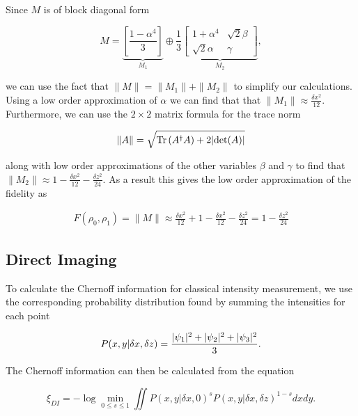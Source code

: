 \documentclass{article}
\DeclarePairedDelimiter\abs{\lvert}{\rvert}%
\begin{document}
Since $M$ is of block diagonal form

\begin{equation}
M = \underbrace{\left[ \frac{1-\alpha^4}{3} \right]}_{M_1} \oplus \frac{1}{3} \underbrace{\begin{bmatrix} 1+\alpha^4 & \sqrt{2}\beta \\ \sqrt{2}\alpha & \gamma \end{bmatrix}}_{M_2},
\end{equation}

we can use the fact that $\|M\| = \|M_1\| + \|M_2\|$ to simplify our calculations.
Using a low order approximation of $\alpha$ we can find that that  $\|M_1\| \approx \frac{\delta x^2}{12}$.
Furthermore, we can use the $2 \times 2$ matrix formula for the trace norm

\begin{equation}
\|A\| = \sqrt{\mathrm{Tr}\left(A^\dagger A \right) + 2 \abs{\mathrm{det}(A)}}
\end{equation}

along with low order approximations of the other variables $\beta$ and $\gamma$ to find that $\|M_2\| \approx 1 - \frac{\delta x^2}{12} - \frac{\delta z^2}{24}$.
As a result this gives the low order approximation of the fidelity as

\begin{equation}
\begin{aligned}
F(\rho_0,\rho_1) = \|M\| \approx \frac{\delta x^2}{12} + 1 - \frac{\delta x^2}{12} - \frac{\delta z^2}{24} = 1 - \frac{\delta z^2}{24}
\end{aligned}
\end{equation}

\subsection*{Direct Imaging}

To calculate the Chernoff information for classical intensity measurement, we use the corresponding probability distribution found by summing the intensities for each point

\begin{equation}
P(x,y|\delta x,\delta z)=\frac{\abs{\psi_1}^2 + \abs{\psi_2}^2 + \abs{\psi_3}^2}{3}.
\end{equation}

The Chernoff information can then be calculated from the equation

\begin{equation}
\xi_{DI} = - \log \min_{0 \leq s \leq 1} \iint P(x,y|\delta x,0)^s P(x,y|\delta x,\delta z)^{1-s} dx dy.
\end{equation}
\end{document}
